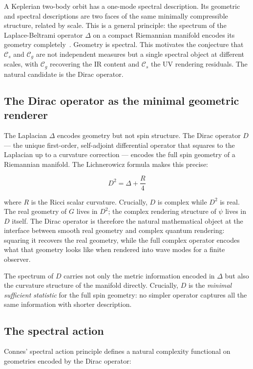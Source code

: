 \documentclass[12pt,a4paper]{article}
\newcommand{\Cs}{\mathcal{C}_s}
\newcommand{\Cg}{\mathcal{C}_g}
\begin{document}
A Keplerian two-body orbit has a one-mode spectral description. Its geometric and spectral descriptions are two faces of the same minimally compressible structure, related by scale. This is a general principle: the spectrum of the Laplace-Beltrami operator $\Delta$ on a compact Riemannian manifold encodes its geometry completely~\cite{berger1971}. Geometry is spectral. This motivates the conjecture that $\Cs$ and $\Cg$ are not independent measures but a single spectral object at different scales, with $\Cg$ recovering the IR content and $\Cs$ the UV rendering residuals. The natural candidate is the Dirac operator.


\subsection*{The Dirac operator as the minimal geometric renderer}

The Laplacian $\Delta$ encodes geometry but not spin structure. The Dirac
operator $D$ --- the unique first-order, self-adjoint differential operator
that squares to the Laplacian up to a curvature correction --- encodes the
full spin geometry of a Riemannian manifold. The Lichnerowicz formula makes
this precise:

\begin{equation}
D^2 = \Delta + \frac{R}{4}
\end{equation}

where $R$ is the Ricci scalar curvature. Crucially, $D$ is complex while $D^2$
is real. The real geometry of $G$ lives in $D^2$; the complex rendering
structure of $\psi$ lives in $D$ itself. The Dirac operator is therefore the
natural mathematical object at the interface between smooth real geometry and
complex quantum rendering: squaring it recovers the real geometry, while the
full complex operator encodes what that geometry looks like when rendered into
wave modes for a finite observer.

The spectrum of $D$ carries not only the metric information encoded in $\Delta$
but also the curvature structure of the manifold directly. Crucially, $D$ is
the \emph{minimal sufficient statistic} for the full spin geometry: no simpler
operator captures all the same information with shorter description.

\subsection*{The spectral action}

Connes' spectral action principle \cite{connes1996} defines a natural
complexity functional on geometries encoded by the Dirac operator:
\end{document}
